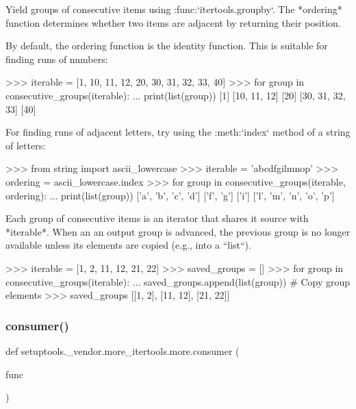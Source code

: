 \begin{DoxyVerb}Yield groups of consecutive items using :func:`itertools.groupby`.
The *ordering* function determines whether two items are adjacent by
returning their position.

By default, the ordering function is the identity function. This is
suitable for finding runs of numbers:

    >>> iterable = [1, 10, 11, 12, 20, 30, 31, 32, 33, 40]
    >>> for group in consecutive_groups(iterable):
    ...     print(list(group))
    [1]
    [10, 11, 12]
    [20]
    [30, 31, 32, 33]
    [40]

For finding runs of adjacent letters, try using the :meth:`index` method
of a string of letters:

    >>> from string import ascii_lowercase
    >>> iterable = 'abcdfgilmnop'
    >>> ordering = ascii_lowercase.index
    >>> for group in consecutive_groups(iterable, ordering):
    ...     print(list(group))
    ['a', 'b', 'c', 'd']
    ['f', 'g']
    ['i']
    ['l', 'm', 'n', 'o', 'p']

Each group of consecutive items is an iterator that shares it source with
*iterable*. When an an output group is advanced, the previous group is
no longer available unless its elements are copied (e.g., into a ``list``).

    >>> iterable = [1, 2, 11, 12, 21, 22]
    >>> saved_groups = []
    >>> for group in consecutive_groups(iterable):
    ...     saved_groups.append(list(group))  # Copy group elements
    >>> saved_groups
    [[1, 2], [11, 12], [21, 22]]\end{DoxyVerb}
 \mbox{\label{namespacesetuptools_1_1__vendor_1_1more__itertools_1_1more_aba2bfd3e5689d1d8c07b735f8e3c1f3d}} 
\subsubsection{\texorpdfstring{consumer()}{consumer()}}
{\footnotesize\ttfamily def setuptools.\+\_\+vendor.\+more\+\_\+itertools.\+more.\+consumer (\begin{DoxyParamCaption}\item[{}]{func }\end{DoxyParamCaption})}

